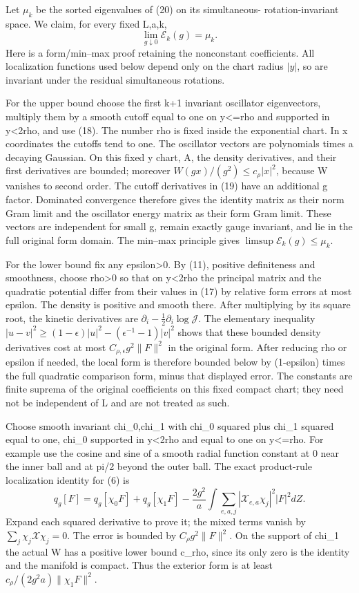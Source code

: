 \documentclass[
  11pt,
]{article}
\begin{document}
Let \(\mu_k\) be the sorted eigenvalues of (20) on its simultaneous-
rotation-invariant space. We claim, for every fixed L,a,k, \[
 \lim_{g\downarrow0}\mathcal E_k(g)=\mu_k.
\tag{22}
\] Here is a form/min--max proof retaining the nonconstant coefficients.
All localization functions used below depend only on the chart radius
\(|y|\), so are invariant under the residual simultaneous rotations.

For the upper bound choose the first k+1 invariant oscillator
eigenvectors, multiply them by a smooth cutoff equal to one on
\textbar y\textbar\textless=rho and supported in
\textbar y\textbar\textless2rho, and use (18). The number rho is fixed
inside the exponential chart. In x coordinates the cutoffs tend to one.
The oscillator vectors are polynomials times a decaying Gaussian. On
this fixed y chart, A, the density derivatives, and their first
derivatives are bounded; moreover \(W(gx)/(g^2)\le c_\rho |x|^2\),
because W vanishes to second order. The cutoff derivatives in (19) have
an additional g factor. Dominated convergence therefore gives the
identity matrix as their norm Gram limit and the oscillator energy
matrix as their form Gram limit. These vectors are independent for small
g, remain exactly gauge invariant, and lie in the full original form
domain. The min--max principle gives \(\limsup\mathcal E_k(g)\le\mu_k\).

For the lower bound fix any epsilon\textgreater0. By (11), positive
definiteness and smoothness, choose rho\textgreater0 so that on
\textbar y\textbar\textless2rho the principal matrix and the quadratic
potential differ from their values in (17) by relative form errors at
most epsilon. The density is positive and smooth there. After
multiplying by its square root, the kinetic derivatives are
\(\partial_i-\tfrac12\partial_i\log\mathcal J\). The elementary
inequality \(|u-v|^2\ge(1-\epsilon)|u|^2-(\epsilon^{-1}-1)|v|^2\) shows
that these bounded density derivatives cost at most
\(C_{\rho,\epsilon}g^2\|F\|^2\) in the original form. After reducing rho
or epsilon if needed, the local form is therefore bounded below by
(1-epsilon) times the full quadratic comparison form, minus that
displayed error. The constants are finite suprema of the original
coefficients on this fixed compact chart; they need not be independent
of L and are not treated as such.

Choose smooth invariant chi\_0,chi\_1 with chi\_0 squared plus chi\_1
squared equal to one, chi\_0 supported in
\textbar y\textbar\textless2rho and equal to one on
\textbar y\textbar\textless=rho. For example use the cosine and sine of
a smooth radial function constant at 0 near the inner ball and at pi/2
beyond the outer ball. The exact product-rule localization identity for
(6) is \[
 q_g[F]=q_g[\chi_0F]+q_g[\chi_1F]
       -\frac{2g^2}{a}\int\sum_{e,a,j}|\mathcal X_{e,a}\chi_j|^2|F|^2dZ.
\tag{23}
\] Expand each squared derivative to prove it; the mixed terms vanish by
\(\sum_j\chi_j\mathcal X\chi_j=0\). The error is bounded by
\(C_\rho g^2\|F\|^2\). On the support of chi\_1 the actual W has a
positive lower bound c\_rho, since its only zero is the identity and the
manifold is compact. Thus the exterior form is at least
\(c_\rho/(2g^2a)\|\chi_1F\|^2\).
\end{document}
